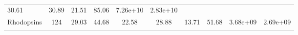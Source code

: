 \documentclass[]{article}
\begin{document}
\begin{longtable}[]{@{}lccccccccc@{}}
\begin{minipage}[t]{0.08\columnwidth}
30.61\strut
\end{minipage} & \begin{minipage}[t]{0.08\columnwidth}\centering\strut
30.89\strut
\end{minipage} & \begin{minipage}[t]{0.08\columnwidth}\centering\strut
21.51\strut
\end{minipage} & \begin{minipage}[t]{0.08\columnwidth}\centering\strut
85.06\strut
\end{minipage} & \begin{minipage}[t]{0.08\columnwidth}\centering\strut
7.26e+10\strut
\end{minipage} & \begin{minipage}[t]{0.08\columnwidth}\centering\strut
2.83e+10\strut
\end{minipage}\tabularnewline
\begin{minipage}[t]{0.07\columnwidth}\raggedright\strut
Rhodopsins\strut
\end{minipage} & \begin{minipage}[t]{0.06\columnwidth}\centering\strut
124\strut
\end{minipage} & \begin{minipage}[t]{0.08\columnwidth}\centering\strut
29.03\strut
\end{minipage} & \begin{minipage}[t]{0.08\columnwidth}\centering\strut
44.68\strut
\end{minipage} & \begin{minipage}[t]{0.08\columnwidth}\centering\strut
22.58\strut
\end{minipage} & \begin{minipage}[t]{0.08\columnwidth}\centering\strut
28.88\strut
\end{minipage} & \begin{minipage}[t]{0.08\columnwidth}\centering\strut
13.71\strut
\end{minipage} & \begin{minipage}[t]{0.08\columnwidth}\centering\strut
51.68\strut
\end{minipage} & \begin{minipage}[t]{0.08\columnwidth}\centering\strut
3.68e+09\strut
\end{minipage} & \begin{minipage}[t]{0.08\columnwidth}\centering\strut
2.69e+09\strut
\end{minipage}\tabularnewline
\begin{minipage}[t]{0.07\columnwidth}\raggedright\strut

\end{minipage}
\end{longtable}
\end{document}
